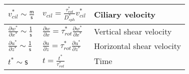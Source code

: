 \documentclass[10pt,a4paper]{article}
\def\p{\partial}
\begin{document}
\begin{table}[h]
\begin{tabular}{|I|L|l|}
		$v^*_{cil} \sim \mathsf{\frac{m}{s}}$ & $v_{cil} = \frac{{\tau^*_{rot}}}{D_{sph}^*}  v^*_{cil}  $  & Ciliary velocity \\
		\hline
		\vspace{0.1cm}
		$\frac{\p w^*}{\p x^*} \sim \mathsf{\frac{1}{s}}$ & $\frac{\p w}{\p x} = \tau^*_{rot} \frac{\p w^*}{\p x^*}  $  & Vertical shear velocity \\
		\vspace{0.1cm}
		$\frac{\p u^*}{\p z^*} \sim \mathsf{\frac{1}{s}}$ & $\frac{\p u}{\p z} = \tau^*_{rot} \frac{\p u^*}{\p z^*}  $  & Horizontal shear velocity \\
		\vspace{0.1cm}
		$t^* \sim \mathsf{s}$ & $t =  \frac{t^*}{\tau^*_{rot}}  $  & Time \\
		\hline
	\end{tabular}
\end{table}
\end{document}
